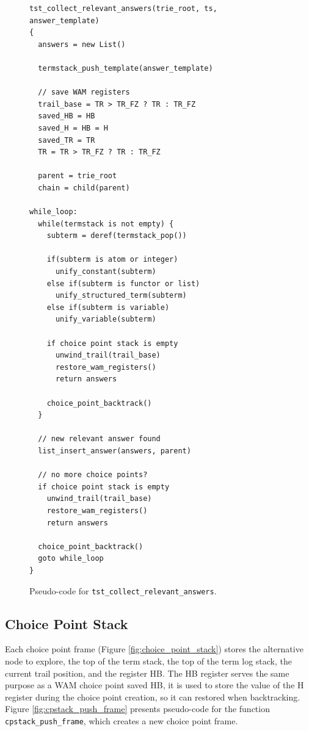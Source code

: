 \begin{figure}[ht]
\begin{Verbatim}
tst_collect_relevant_answers(trie_root, ts, answer_template)
{
  answers = new List()
  
  termstack_push_template(answer_template)
  
  // save WAM registers
  trail_base = TR > TR_FZ ? TR : TR_FZ
  saved_HB = HB
  saved_H = HB = H
  saved_TR = TR
  TR = TR > TR_FZ ? TR : TR_FZ
  
  parent = trie_root
  chain = child(parent)
  
while_loop:
  while(termstack is not empty) {
    subterm = deref(termstack_pop())
    
    if(subterm is atom or integer)
      unify_constant(subterm)
    else if(subterm is functor or list)
      unify_structured_term(subterm)
    else if(subterm is variable)
      unify_variable(subterm)
      
    if choice point stack is empty
      unwind_trail(trail_base)
      restore_wam_registers()
      return answers
    
    choice_point_backtrack()
  }
  
  // new relevant answer found
  list_insert_answer(answers, parent)
  
  // no more choice points?
  if choice point stack is empty
    unwind_trail(trail_base)
    restore_wam_registers()
    return answers
    
  choice_point_backtrack()
  goto while_loop
}
\end{Verbatim}
\caption{Pseudo-code for \texttt{tst\_collect\_relevant\_answers}.}
\label{fig:tst_collect_relevant_answers}
\end{figure}

\subsection{Choice Point Stack}

Each choice point frame (Figure \ref{fig:choice_point_stack}) stores the alternative node to explore, the top of the term stack, the top of the term log stack, the current trail position, and the register HB. The HB register serves the same purpose as a WAM choice point saved HB, it is used to store the value of the H register during the choice point creation, so it can restored when backtracking. Figure \ref{fig:cpstack_push_frame} presents pseudo-code for the function \texttt{cpstack\_push\_frame}, which creates a new choice point frame.

